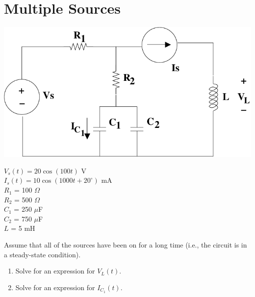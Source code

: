 \section{Multiple Sources}\label{sect:super}
\begin{minipage}[l]{0.6\linewidth}
\hspace*{0.5in} \includegraphics[width=0.7\linewidth]{superposition/superposition}
\end{minipage}\hfill
\begin{minipage}[l]{0.4\linewidth}
$V_s(t) = 20 \cos(100t)$ V\\ 
$I_s(t) = 10 \cos(1000t+20^\circ)$ mA\\
$R_1$ = 100 $\Omega$\\
$R_2$ = 500 $\Omega$\\ 
$C_1$ = 250 $\mu$F\\ 
$C_2$ = 750 $\mu$F\\ 
$L$ = 5 mH\\
\end{minipage}

Assume that all of the sources have been on for a long time (i.e., the circuit
is in a steady-state condition).

\begin{enumerate}
    \item Solve for an expression for $V_L(t)$.  \\
    \item Solve for an expression for $I_{C_1}(t)$. \\
\end{enumerate}
